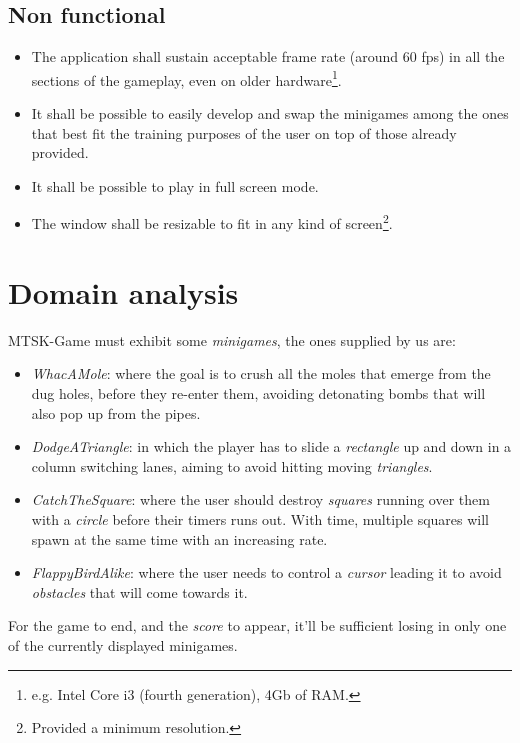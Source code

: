 \documentclass[a4paper,12pt]{report}
\begin{document}
\subsection*{Non functional}
\begin{itemize}
	\item The application shall sustain acceptable frame rate (around 60 fps) in all the sections of the gameplay, even on older hardware\footnote{e.g. Intel Core i3 (fourth generation), 4Gb of RAM.}.
	\item It shall be possible to easily develop and swap the minigames among the ones that best fit the training purposes of the user on top of those already provided.
	\item It shall be possible to play in full screen mode.
	\item The window shall be resizable to fit in any kind of screen\footnote{Provided a minimum resolution.}.
\end{itemize}



\section{Domain analysis}

MTSK-Game must exhibit some \textit{minigames}, the ones supplied by us are:
\begin{itemize}
	\item \textit{WhacAMole}: where the goal is to crush all the moles that emerge from the dug holes, before they re-enter them, avoiding detonating bombs that will also pop up from the pipes.
	\item \textit{DodgeATriangle}: in which the player has to slide a \textit{rectangle} up and down in a column switching lanes, aiming to avoid hitting moving \textit{triangles}.
	\item \textit{CatchTheSquare}: where the user should destroy \textit{squares} running over them with a \textit{circle} before their timers runs out. With time, multiple squares will spawn at the same time with an increasing rate.
	\item \textit{FlappyBirdAlike}: where the user needs to control a \textit{cursor} leading it to avoid \textit{obstacles} that will come towards it.
\end{itemize}
For the game to end, and the \textit{score} to appear, it'll be sufficient losing in only one of the currently displayed minigames.
\end{document}
